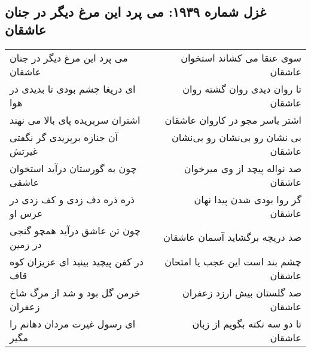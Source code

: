 \begin{center}
\section*{غزل شماره ۱۹۳۹: می پرد این مرغ دیگر در جنان عاشقان}
\label{sec:1939}
\begin{longtable}{l p{0.5cm} r}
می پرد این مرغ دیگر در جنان عاشقان
&&
سوی عنقا می کشاند استخوان عاشقان
\\
ای دریغا چشم بودی تا بدیدی در هوا
&&
تا روان دیدی روان گشته روان عاشقان
\\
اشتران سربریده پای بالا می نهند
&&
اشتر باسر مجو در کاروان عاشقان
\\
آن جنازه برپریدی گر نگفتی غیرتش
&&
بی نشان رو بی‌نشان رو بی‌نشان عاشقان
\\
چون به گورستان درآید استخوان عاشقی
&&
صد نواله پیچد از وی میرخوان عاشقان
\\
ذره ذره دف زدی و کف زدی در عرس او
&&
گر روا بودی شدن پیدا نهان عاشقان
\\
چون تن عاشق درآید همچو گنجی در زمین
&&
صد دریچه برگشاید آسمان عاشقان
\\
در کفن پیچید بینید ای عزیزان کوه قاف
&&
چشم بند است این عجب یا امتحان عاشقان
\\
خرمن گل بود و شد از مرگ شاخ زعفران
&&
صد گلستان بیش ارزد زعفران عاشقان
\\
ای رسول غیرت مردان دهانم را مگیر
&&
تا دو سه نکته بگویم از زبان عاشقان
\\
\end{longtable}
\end{center}
